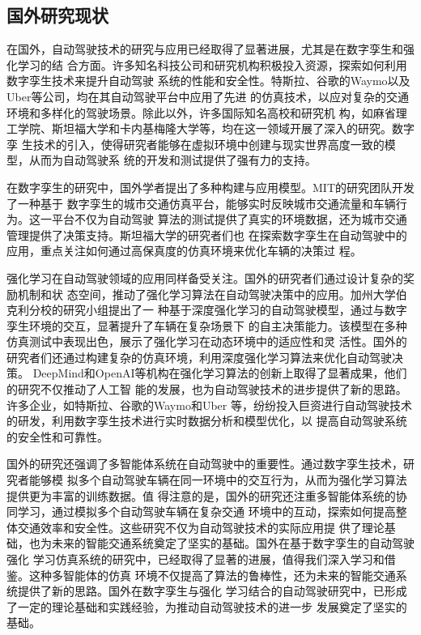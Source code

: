 \subsection{国外研究现状}

在国外，自动驾驶技术的研究与应用已经取得了显著进展，尤其是在数字孪生和强化学习的结
合方面。许多知名科技公司和研究机构积极投入资源，探索如何利用数字孪生技术来提升自动驾驶
系统的性能和安全性。特斯拉、谷歌的Waymo以及Uber等公司，均在其自动驾驶平台中应用了先进
的仿真技术，以应对复杂的交通环境和多样化的驾驶场景。除此以外，许多国际知名高校和研究机
构，如麻省理工学院、斯坦福大学和卡内基梅隆大学等，均在这一领域开展了深入的研究。数字孪
生技术的引入，使得研究者能够在虚拟环境中创建与现实世界高度一致的模型，从而为自动驾驶系
统的开发和测试提供了强有力的支持。

在数字孪生的研究中，国外学者提出了多种构建与应用模型。MIT的研究团队开发了一种基于
数字孪生的城市交通仿真平台，能够实时反映城市交通流量和车辆行为。这一平台不仅为自动驾驶
算法的测试提供了真实的环境数据，还为城市交通管理提供了决策支持。斯坦福大学的研究者们也
在探索数字孪生在自动驾驶中的应用，重点关注如何通过高保真度的仿真环境来优化车辆的决策过
程。

强化学习在自动驾驶领域的应用同样备受关注。国外的研究者们通过设计复杂的奖励机制和状
态空间，推动了强化学习算法在自动驾驶决策中的应用。加州大学伯克利分校的研究小组提出了一
种基于深度强化学习的自动驾驶模型，通过与数字孪生环境的交互，显著提升了车辆在复杂场景下
的自主决策能力。该模型在多种仿真测试中表现出色，展示了强化学习在动态环境中的适应性和灵
活性。国外的研究者们还通过构建复杂的仿真环境，利用深度强化学习算法来优化自动驾驶决策。
DeepMind和OpenAI等机构在强化学习算法的创新上取得了显著成果，他们的研究不仅推动了人工智
能的发展，也为自动驾驶技术的进步提供了新的思路。许多企业，如特斯拉、谷歌的Waymo和Uber
等，纷纷投入巨资进行自动驾驶技术的研发，利用数字孪生技术进行实时数据分析和模型优化，以
提高自动驾驶系统的安全性和可靠性。

国外的研究还强调了多智能体系统在自动驾驶中的重要性。通过数字孪生技术，研究者能够模
拟多个自动驾驶车辆在同一环境中的交互行为，从而为强化学习算法提供更为丰富的训练数据。值
得注意的是，国外的研究还注重多智能体系统的协同学习，通过模拟多个自动驾驶车辆在复杂交通
环境中的互动，探索如何提高整体交通效率和安全性。这些研究不仅为自动驾驶技术的实际应用提
供了理论基础，也为未来的智能交通系统奠定了坚实的基础。国外在基于数字孪生的自动驾驶强化
学习仿真系统的研究中，已经取得了显著的进展，值得我们深入学习和借鉴。这种多智能体的仿真
环境不仅提高了算法的鲁棒性，还为未来的智能交通系统提供了新的思路。国外在数字孪生与强化
学习结合的自动驾驶研究中，已形成了一定的理论基础和实践经验，为推动自动驾驶技术的进一步
发展奠定了坚实的基础。





\begin{tabular}{l l}
\end{tabular}
